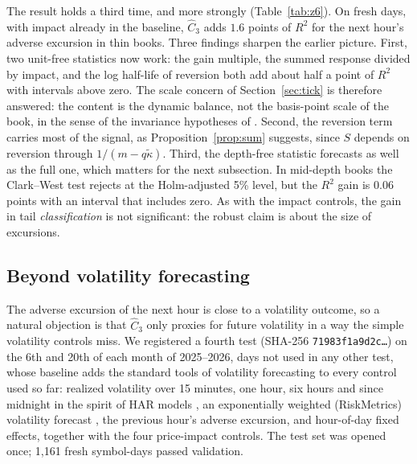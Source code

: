 \documentclass[12pt]{article}
\theoremstyle{definition}
\theoremstyle{remark}
\begin{document}
The result holds a third time, and more strongly (Table~\ref{tab:z6}). On fresh days, with impact already in the baseline, $\hat C_3$ adds $1.6$ points of $R^2$ for the next hour's adverse excursion in thin books. Three findings sharpen the earlier picture. First, two unit-free statistics now work: the gain multiple, the summed response divided by impact, and the log half-life of reversion both add about half a point of $R^2$ with intervals above zero. The scale concern of Section~\ref{sec:tick} is therefore answered: the content is the dynamic balance, not the basis-point scale of the book, in the sense of the invariance hypotheses of \citet{kyle2016}. Second, the reversion term carries most of the signal, as Proposition~\ref{prop:sum} suggests, since $S$ depends on reversion through $1/(m-q\tilde\kappa)$. Third, the depth-free statistic forecasts as well as the full one, which matters for the next subsection. In mid-depth books the Clark--West test rejects at the Holm-adjusted 5\% level, but the $R^2$ gain is $0.06$ points with an interval that includes zero. As with the impact controls, the gain in tail \emph{classification} is not significant: the robust claim is about the size of excursions.

\subsection{Beyond volatility forecasting}\label{sec:z9}
The adverse excursion of the next hour is close to a volatility outcome, so a natural objection is that $\hat C_3$ only proxies for future volatility in a way the simple volatility controls miss. We registered a fourth test (SHA-256 \texttt{71983f1a9d2c\ldots}) on the 6th and 20th of each month of 2025--2026, days not used in any other test, whose baseline adds the standard tools of volatility forecasting to every control used so far: realized volatility over 15 minutes, one hour, six hours and since midnight in the spirit of HAR models \citep{corsi2009}, an exponentially weighted (RiskMetrics) volatility forecast \citep{riskmetrics1996}, the previous hour's adverse excursion, and hour-of-day fixed effects, together with the four price-impact controls. The test set was opened once; 1{,}161 fresh symbol-days passed validation.
\end{document}
